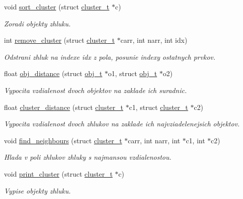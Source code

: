 \begin{DoxyCompactItemize}
void \hyperlink{group___praca_ga12718af9e3e31b61bf703ec260e22450}{sort\+\_\+cluster} (struct \hyperlink{structcluster__t}{cluster\+\_\+t} $\ast$c)
\begin{DoxyCompactList}\small\item\em Zoradi objekty zhluku. \end{DoxyCompactList}\item 
int \hyperlink{group___praca_gaf73744f9128e4605127b40932a730a48}{remove\+\_\+cluster} (struct \hyperlink{structcluster__t}{cluster\+\_\+t} $\ast$carr, int narr, int idx)
\begin{DoxyCompactList}\small\item\em Odstrani zhluk na indexe idx z pola, posunie indexy ostatnych prvkov. \end{DoxyCompactList}\item 
float \hyperlink{group___praca_ga703ce6afddf65026b68645bc5394405b}{obj\+\_\+distance} (struct \hyperlink{structobj__t}{obj\+\_\+t} $\ast$o1, struct \hyperlink{structobj__t}{obj\+\_\+t} $\ast$o2)
\begin{DoxyCompactList}\small\item\em Vypocita vzdialenost dvoch objektov na zaklade ich suradnic. \end{DoxyCompactList}\item 
float \hyperlink{group___praca_gaf336f28a62c28da792f6def84f432bb2}{cluster\+\_\+distance} (struct \hyperlink{structcluster__t}{cluster\+\_\+t} $\ast$c1, struct \hyperlink{structcluster__t}{cluster\+\_\+t} $\ast$c2)
\begin{DoxyCompactList}\small\item\em Vypocita vzdialenost dvoch zhlukov na zaklade ich najvziadelenejsich objektov. \end{DoxyCompactList}\item 
void \hyperlink{group___praca_ga5f16d682e7c859f7bd3f27697c2b7cc0}{find\+\_\+neighbours} (struct \hyperlink{structcluster__t}{cluster\+\_\+t} $\ast$carr, int narr, int $\ast$c1, int $\ast$c2)
\begin{DoxyCompactList}\small\item\em Hlada v poli zhlukov zhluky s najmansou vzdialenostou. \end{DoxyCompactList}\item 
void \hyperlink{group___praca_ga322bfd43ab7a3fa830cd69e79b7eef06}{print\+\_\+cluster} (struct \hyperlink{structcluster__t}{cluster\+\_\+t} $\ast$c)
\begin{DoxyCompactList}\small\item\em Vypise objekty zhluku. \end{DoxyCompactList}\item 

\end{DoxyCompactItemize}

